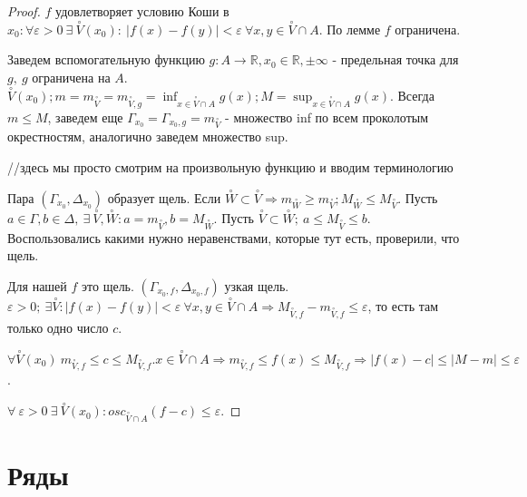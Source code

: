 \documentclass[11pt]{book}
\newcommand{\R}{\mathbb{R}}
\newcommand{\pivi}{\stackrel \circ }
\renewcommand{\le}{\leqslant}
\renewcommand{\ge}{\geqslant}
\theoremstyle{definition}
\theoremstyle{plain}
\theoremstyle{plain}
\theoremstyle{definition}
\theoremstyle{remark}
\begin{document}
\begin{proof}
$f$ удовлетворяет условию Коши в $x_0: \forall \varepsilon > 0 ~\exists ~\pivi V(x_0): ~|f(x) - f(y)| < \varepsilon ~\forall x, y \in \pivi V\cap A$. По лемме $f$ ограничена. 

Заведем вспомогательную функцию $g: A \to \R, x_0 \in \R, \pm\infty$ - предельная точка для $g, ~g$ ограничена на $A$. $\pivi V(x_0); m = m_{\pivi V} = m_{\pivi V, g} = \inf_{x \in \pivi V \cap A}{g(x)}; M = \sup_{x \in \pivi V \cap A}{g(x)}$. Всегда $m \le M$, заведем еще $\Gamma_{x_0} = \Gamma_{x_0, g} = {m_{\pivi V}}$ - множество inf по всем проколотым окрестностям, аналогично заведем множество sup. 

//здесь мы просто смотрим на произвольную функцию и вводим терминологию

Пара $(\Gamma_{x_0}, \Delta_{x_0})$ образует щель. Если $\pivi W \subset \pivi V \Rightarrow m_{\pivi W} \ge m_{\pivi V}; M_{\pivi W} \le M_{\pivi V}$. Пусть $a \in \Gamma, b \in \Delta, ~\exists ~\pivi V, \pivi W: a = m_{\pivi V}, b = M_{\pivi W}$. Пусть $\pivi V  \subset \pivi W; ~a \le M_{\pivi V} \le b$. Воспользовались какими нужно неравенствами, которые тут есть, проверили, что щель.

Для нашей $f$ это щель. $(\Gamma_{x_0, f}, \Delta_{x_0, f})$ узкая щель. $\varepsilon > 0; ~\exists \pivi V: |f(x) - f(y)| < \varepsilon ~\forall x, y \in \pivi V \cap A \Rightarrow M_{\pivi V, f} - m_{\pivi V, f} \le \varepsilon$, то есть там только одно число $c$.

$\forall \pivi V(x_0) ~m_{\pivi V, f} \le c \le M_{\pivi V, f}. x \in \pivi V \cap A \Rightarrow m_{\pivi V, f} \le f(x) \le M_{\pivi V, f} \Rightarrow |f(x) - c| \le |M - m| \le \varepsilon$.

$\forall ~\varepsilon > 0 ~\exists ~\pivi V(x_0): osc_{\pivi V \cap A}(f - c) \le \varepsilon$.
\end{proof}
\section{Ряды}
\end{document}

